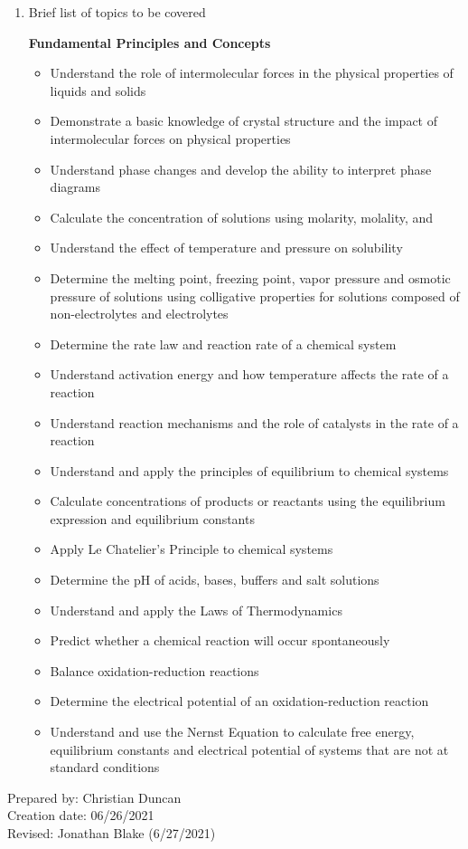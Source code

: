 \begin{enumerate}[1.]
\item Brief list of topics to be covered\\
  {\bfseries
    Fundamental Principles and Concepts
    \begin{itemize}
      \item Understand the role of intermolecular forces in the physical properties of liquids and solids
      \item Demonstrate a basic knowledge of crystal structure and the impact of intermolecular forces on physical properties
      \item Understand phase changes and develop the ability to interpret phase diagrams
      \item Calculate the concentration of solutions using molarity, molality, and %
      \item Understand the effect of temperature and pressure on solubility
      \item Determine the melting point, freezing point, vapor pressure and osmotic pressure of solutions using colligative properties for solutions composed of non-electrolytes and electrolytes
      \item Determine the rate law and reaction rate of a chemical system
      \item Understand activation energy and how temperature affects the rate of a reaction
      \item Understand reaction mechanisms and the role of catalysts in the rate of a reaction
      \item Understand and apply the principles of equilibrium to chemical systems
      \item Calculate concentrations of products or reactants using the equilibrium expression and equilibrium constants
      \item Apply Le Chatelier’s Principle to chemical systems
      \item Determine the pH of acids, bases, buffers and salt solutions
      \item Understand and apply the Laws of Thermodynamics
      \item Predict whether a chemical reaction will occur spontaneously
      \item Balance oxidation-reduction reactions
      \item Determine the electrical potential of an oxidation-reduction reaction
      \item Understand and use the Nernst Equation to calculate free energy, equilibrium constants and electrical potential of systems that are not at standard conditions
    \end{itemize}
  }

\end{enumerate}

\noindent Prepared by: Christian Duncan\\
\noindent Creation date: 06/26/2021\\
\noindent Revised: Jonathan Blake (6/27/2021)\\

